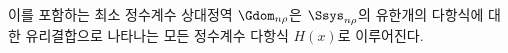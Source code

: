 
이를 포함하는 최소 정수계수 상대정역 $\Gdom_{n\rho}$은 $\Ssys_{n\rho}$의 유한개의 다항식에 대한 유리결합으로 나타나는 모든 정수계수 다항식 $H(x)$로 이루어진다.
